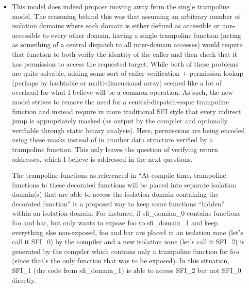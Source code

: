 \documentclass[12pt]{article}
\begin{document}
\begin{itemize}
	\item This model does indeed propose moving away from the single trampoline model. The reasoning behind this was that assuming an arbitrary number of isolation domains where each domain is either defined as accessible or non-accessible to every other domain, having a single trampoline function (acting as something of a central dispatch to all inter-domain accesses) would require that function to both verify the identity of the caller and then check that it has permission to access the requested target. While both of these problems are quite solvable, adding some sort of caller verification + permission lookup (perhaps by hashtable or multi-dimensional array) seemed like a lot of overhead for what I believe will be a common operation. As such, the new model strives to remove the need for a central-dispatch-esque trampoline function and instead require in more traditional SFI style that every indirect jump is appropriately masked (as output by the compiler and optionally verifiable through static binary analysis). Here, permissions are being encoded using these masks instead of in another data structure verified by a trampoline function. This only leaves the question of verifying return addresses, which I believe is addressed in the next questions.

The trampoline functions as referenced in ``At compile time, trampoline functions to these decorated functions will be placed into separate isolation domain(s) that are able to access the isolation domain containing the decorated function'' is a proposed way to keep some functions ``hidden'' within an isolation domain. For instance, if sfi\_domian\_0 contains functions foo and bar, but only wants to expose foo to sfi\_domain\_1 and keep everything else non-exposed, foo and bar are placed in an isolation zone (let’s call it SFI\_0) by the compiler and a new isolation zone (let’s call it SFI\_2) is generated by the compiler which contains only a trampoline function for foo (since that's the only function that was to be exposed). In this situation, SFI\_1 (the code from sfi\_domain\_1) is able to access SFI\_2 but not SFI\_0 directly.


\end{itemize}
\end{document}
